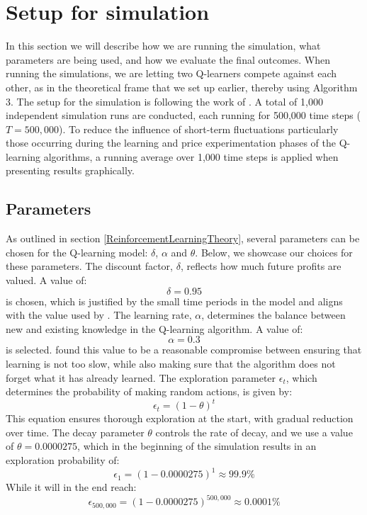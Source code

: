 \documentclass{article}
\begin{document}
\section{Setup for simulation}
In this section we will describe how we are running the simulation, what parameters are being used, and how we evaluate the final outcomes.  
\newline
When running the simulations, we are letting two Q-learners compete against each other, as in the theoretical frame that we set up earlier, thereby using Algorithm 3.
\newline
The setup for the simulation is following the work of \cite{Klein2021}. A total of 1,000 independent simulation runs are conducted, each running for 500,000 time steps ($T = 500,000$). To reduce the influence of short-term fluctuations particularly those occurring during the learning and price experimentation phases of the Q-learning algorithms, a running average over 1,000 time steps is applied when presenting results graphically.
\subsection{Parameters}
\label{Parameters}
As outlined in section \ref{ReinforcementLearningTheory}, several parameters can be chosen for the Q-learning model: $\delta$, $\alpha$ and $\theta$. Below, we showcase our choices for these parameters.
\newline
The discount factor, $\delta$, reflects how much future profits are valued. A value of:
$$\delta = 0.95$$
is chosen, which is justified by the small time periods in the model and aligns with the value used by \cite{Klein2021}.
\newline
The learning rate, $\alpha$, determines the balance between new and existing knowledge in the Q-learning algorithm. A value of:
$$\alpha = 0.3$$
is selected. \cite{Klein2021} found this value to be a reasonable compromise between ensuring that learning is not too slow, while also making sure that the algorithm does not forget what it has already learned.
\newline
The exploration parameter $\epsilon_t$, which determines the probability of making random actions, is given by:
\begin{equation}
\label{eq:epsilon-theta}
    \epsilon_t = (1-\theta)^t
\end{equation}
This equation ensures thorough exploration at the start, with gradual reduction over time. The decay parameter $\theta$ controls the rate of decay, and we use a  value of $\theta = 0.0000275$, which in the beginning of the simulation results in an exploration probability of:
\begin{equation}
    \epsilon_{1} = (1 - 0.0000275)^{1} \approx 99.9\%
\end{equation}
While it will in the end reach:
\begin{equation}
    \epsilon_{500,000} = (1 - 0.0000275)^{500,000} \approx 0.0001\%
\end{equation}
\end{document}
